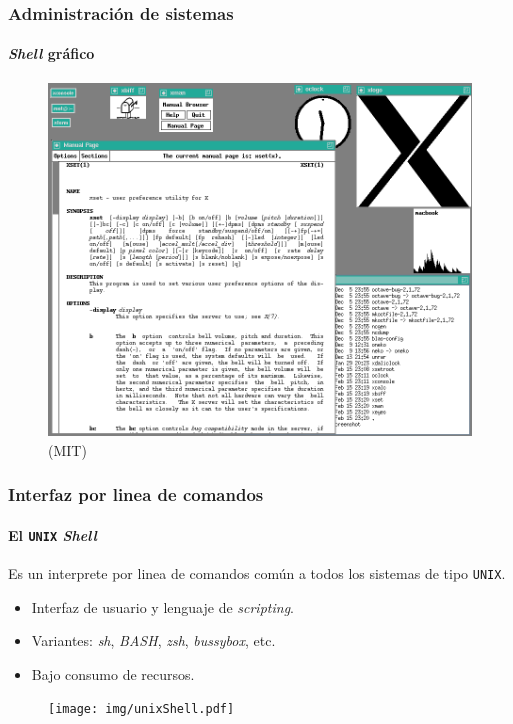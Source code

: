 \documentclass[11pt,a4paper,spanish]{beamer}
\begin{document}
\begin{frame}

    \frametitle{Administración de sistemas}
    \framesubtitle{\emph{Shell} gráfico}

    \begin{figure}
    \centering
    \includegraphics[height=0.8\textheight]{img/xwinsys.png}
        \captionsetup{textfont=tiny,labelformat=empty,justification=centering}
        \caption{(MIT)\cite{xwinsys}}
    \end{figure}

\end{frame}

\begin{frame}

    \frametitle{Interfaz por linea de comandos}
    \framesubtitle{El \texttt{UNIX} \emph{Shell}}

    Es un interprete por linea de comandos común a todos los sistemas de tipo
    \texttt{UNIX}.
    \begin{itemize}
        \item Interfaz de usuario y lenguaje de \emph{scripting}.
        \item Variantes: \emph{sh}, \emph{BASH}, \emph{zsh}, \emph{bussybox},
            etc.
    \item Bajo consumo de recursos.
    \end{itemize}

    \begin{figure}
    \centering
    \texttt{[image: img/unixShell.pdf]}
    \end{figure}

\end{frame}
\end{document}
